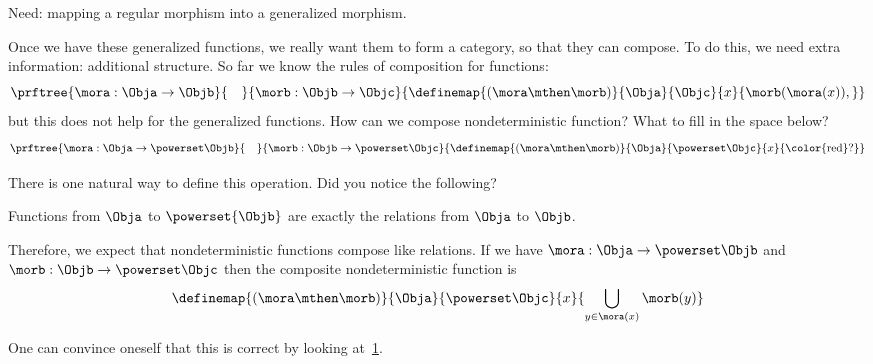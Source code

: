 Need: mapping a regular morphism into a generalized morphism.

Once we have these generalized functions, we really want them to form a category, so that they can compose. To do this, we need extra information: additional structure.
So far we know the rules of composition for functions:
% 
\begin{equation}\label{eq:monad-function-composition}
    \prftree{\mora: \Obja \to \Objb}{\quad}{\morb: \Objb \to \Objc}
    {\definemap{(\mora\mthen\morb)}{\Obja}{\Objc}%
    {x}{\morb(\mora(x)),}}
  \end{equation}
%   
but this does not help for the generalized functions. How can we compose nondeterministic function? What to fill in the space below?
% 
\begin{equation}\label{eq:monad-gen-function-composition}
    \prftree{\mora: \Obja \to \powerset\Objb}{\quad}{\morb: \Objb \to \powerset \Objc}
    {\definemap{(\mora\mthen\morb)}{\Obja}{\powerset\Objc}%
    {x}{\text{\color{red}?}}}
  \end{equation}

There is one natural way to define this operation. 
Did you notice the following?

\begin{lemma}\label{lem:powersets-relations}
Functions from $\Obja$ to $\powerset{\Objb}$ are exactly the relations from $\Obja$ to $\Objb$.
\end{lemma}


Therefore, we expect that nondeterministic functions compose like relations.
If we have $\mora: \Obja \to \powerset\Objb$ and $\morb: \Objb \to \powerset \Objc$ then the composite nondeterministic function is 
%
\begin{equation}\label{eq:fish-nondet}
    \definemap{(\mora\mthen\morb)}{\Obja}{\powerset\Objc}%
    {x}{ \displaystyle \bigcup_{y\in \mora(x)}\morb(y)}
\end{equation}

One can convince oneself that this is correct by looking at~\cref{fig:mapping-nondeterministic}.

\begin{figure}[h]
    \caption{}
    \label{fig:mapping-nondeterministic}
\end{figure}

